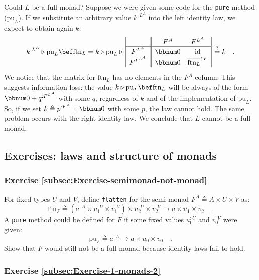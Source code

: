 Could $L$ be a full monad? Suppose we were given some code for the
\lstinline!pure! method ($\text{pu}_{L}$). If we substitute an arbitrary
value $k^{:L^{A}}$ into the left identity law, we expect to obtain
again $k$:
\[
k^{:L^{A}}\triangleright\text{pu}_{L}\bef\text{ftn}_{L}=k\triangleright\text{pu}_{L}\triangleright\,\begin{array}{|c||cc|}
 & F^{A} & F^{L^{A}}\\
\hline F^{L^{A}} & \bbnum 0 & \text{id}\\
F^{L^{L^{A}}} & \bbnum 0 & \overline{\text{ftn}_{L}}^{\uparrow F}
\end{array}\,\overset{?}{=}k\quad.
\]
We notice that the matrix for $\text{ftn}_{L}$ has no elements in
the $F^{A}$ column. This suggests information loss: the value $k\triangleright\text{pu}_{L}\bef\text{ftn}_{L}$
will be always of the form $\bbnum 0+q^{:F^{L^{A}}}$ with some $q$,
regardless of $k$ and of the implementation of $\text{pu}_{L}$.
So, if we set $k\triangleq p^{:F^{A}}+\bbnum 0$ with some $p$, the
law cannot  hold. The same problem occurs with the right identity
law. We conclude that $L$ cannot be a full monad.

\subsection{Exercises: laws and structure of monads}

\subsubsection{Exercise \label{subsec:Exercise-semimonad-not-monad}\ref{subsec:Exercise-semimonad-not-monad}}

For fixed types $U$ and $V$, define \lstinline!flatten! for the
semi-monad $F^{A}\triangleq A\times U\times V$ as:
\[
\text{ftn}_{F}\triangleq(a^{:A}\times u_{1}^{:U}\times v_{1}^{:V})\times u_{2}^{:U}\times v_{2}^{:V}\rightarrow a\times u_{1}\times v_{2}\quad.
\]
A \lstinline!pure! method could be defined for $F$ if some fixed
values $u_{0}^{:U}$ and $v_{0}^{:V}$ were given:
\[
\text{pu}_{F}\triangleq a^{:A}\rightarrow a\times u_{0}\times v_{0}\quad.
\]
Show that $F$ would still not be a full monad because identity laws
fail to hold.

\subsubsection{Exercise \label{subsec:Exercise-1-monads-2}\ref{subsec:Exercise-1-monads-2}}

